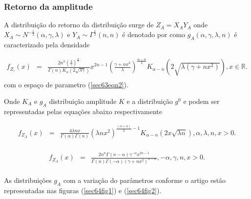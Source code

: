 \documentclass[12pt,a4paper]{article}
\begin{document}
\subsubsection{Retorno da amplitude}

A distribuição do retorno da distribuição surge de $Z_{A}=X_{A}Y_{A}$ onde $X_{A}\sim N^{-\frac{1}{2}}(\alpha,\gamma,\lambda)$  e $Y_{A}\sim\Gamma^{\frac{1}{2}}(n,n)$ é denotado por como $g_{A}(\alpha,\gamma,\lambda,n)$ é caracterizado pela densidade  

\begin{equation}\label{sec64eqn1}
\begin{array}{ccc}
	f_{Z_{\circ}}(x)&=&\frac{2n^n\left(\frac{\lambda}{\gamma}\right)^{\frac{\alpha}{2}}}{\Gamma(n)K_{\alpha}(2\sqrt{\lambda\gamma})}x^{2n-1}\left(\frac{\gamma+nx^2}{\lambda}\right)^{\frac{\alpha-n}{2}}K_{\alpha-n}(2\sqrt{\lambda(\gamma+nx^2)}), x\in\mathbb{R}. \\
\end{array}
\end{equation}
com o espaço de parametro (\ref{sec63eqn2}).

Onde $K_{A}$ e $g_{A}$  distribuição amplitude $K$ e a distribuição $g^0$ e podem ser representadas pelas equações abaixo respectivamente

\begin{equation}\label{sec64eqn2}
\begin{array}{ccc}
	f_{Z_{A}}(x)&=& \frac{4\lambda n x}{\Gamma(\alpha)\Gamma(n)}(\lambda n x^2)^{\frac{(\alpha+n)}{2}-1} K_{\alpha-n}(2x\sqrt{\lambda n}), \alpha,\lambda,n, x>0. \\
\end{array}
\end{equation}

\begin{equation}\label{sec64eqn3}
\begin{array}{ccc}
	f_{Z_{A}}(x)&=& \frac{2n^n\Gamma(n-\alpha)\gamma^{-\alpha}x^{2n-1}}{\Gamma(n)\Gamma(-\alpha)(\gamma+nx^2)^{n-\alpha}}, -\alpha,\gamma,n, x>0. \\
\end{array}
\end{equation}


As distribuições $g_A$ com a variação do parâmetros conforme o artigo estão representadas nas figuras (\ref{sec64fig1}) e (\ref{sec64fig2}).
\end{document}
